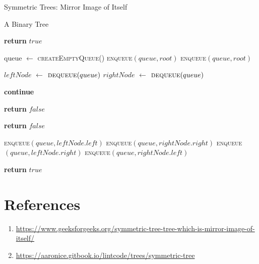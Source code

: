 \documentclass[12pt]{article}
\begin{document}
\begin{algorithm}

  \caption{Symmetric Trees: Mirror Image of Itself}
  
  \begin{algorithmic}[1]
    \Require A Binary Tree
    \Statex

    
    \Statex
    
            \State \textbf{return} $true$
        \EndIf
        
        \State queue $\gets$ \textsc{createEmptyQueue}()
        \State \textsc{enqueue}$(queue, root)$
        \State \textsc{enqueue}$(queue, root)$
        
            \State $leftNode$ $\gets$ $\textsc{dequeue}(queue)$
            \State $rightNode$ $\gets$ $\textsc{dequeue}(queue)$
            
                \State \textbf{continue}
            \EndIf
    
            \State \textbf{return} $false$
            \EndIf
            
                \State \textbf{return} $false$   
            \EndIf

        \State \textsc{enqueue}$(queue, leftNode.left)$
        \State \textsc{enqueue}$(queue, rightNode.right)$
        \State \textsc{enqueue}$(queue, leftNode.right)$
        \State \textsc{enqueue}$(queue, rightNode.left)$
        
    \EndWhile
    \State \textbf{return} $true$

    \EndFunction
  \end{algorithmic}
  
\end{algorithm}

\section{References}
\begin{enumerate}
    \item \url{https://www.geeksforgeeks.org/symmetric-tree-tree-which-is-mirror-image-of-itself/}
    \item \url{https://aaronice.gitbook.io/lintcode/trees/symmetric-tree}
\end{enumerate}
\end{document}

